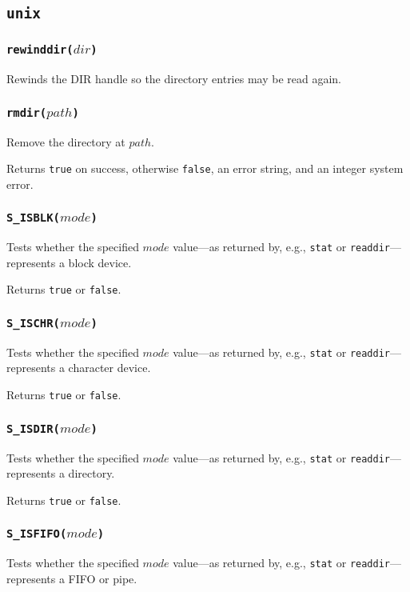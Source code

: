 \documentclass[11pt, oneside]{memoir}
\newcommand*{\true}[0]{\texttt{true}\xspace}
\newcommand*{\false}[0]{\texttt{false}\xspace}
\newcommand*{\syscall}[1]{\texttt{#1}\xspace}
\newcommand*{\fn}[1]{\texttt{#1}\xspace}
\newcounter{toccols}
\newenvironment{Module}[1]{
	\subsection{\texttt{#1}}
	\addtocontents{toc}{
		\protect\begin{multicols}{\value{toccols}}
	}
}{
	\addtocontents{toc}{\protect\end{multicols}}
}
\begin{document}
\begin{Module}{unix}
\subsubsection[\fn{rewinddir}]{\fn{rewinddir($dir$)}}

Rewinds the DIR handle so the directory entries may be read again.

\subsubsection[\fn{rmdir}]{\fn{rmdir($path$)}}

Remove the directory at $path$.

Returns \true on success, otherwise \false, an error string, and an integer system error.

\subsubsection[\fn{S\_ISBLK}]{\fn{S\_ISBLK($mode$)}}

Tests whether the specified $mode$ value---as returned by, e.g., \syscall{stat} or \syscall{readdir}---represents a block device.

Returns \true or \false.

\subsubsection[\fn{S\_ISCHR}]{\fn{S\_ISCHR($mode$)}}

Tests whether the specified $mode$ value---as returned by, e.g., \syscall{stat} or \syscall{readdir}---represents a character device.

Returns \true or \false.

\subsubsection[\fn{S\_ISDIR}]{\fn{S\_ISDIR($mode$)}}

Tests whether the specified $mode$ value---as returned by, e.g., \syscall{stat} or \syscall{readdir}---represents a directory.

Returns \true or \false.

\subsubsection[\fn{S\_ISFIFO}]{\fn{S\_ISFIFO($mode$)}}

Tests whether the specified $mode$ value---as returned by, e.g., \syscall{stat} or \syscall{readdir}---represents a FIFO or pipe.


\end{Module}
\end{document}
